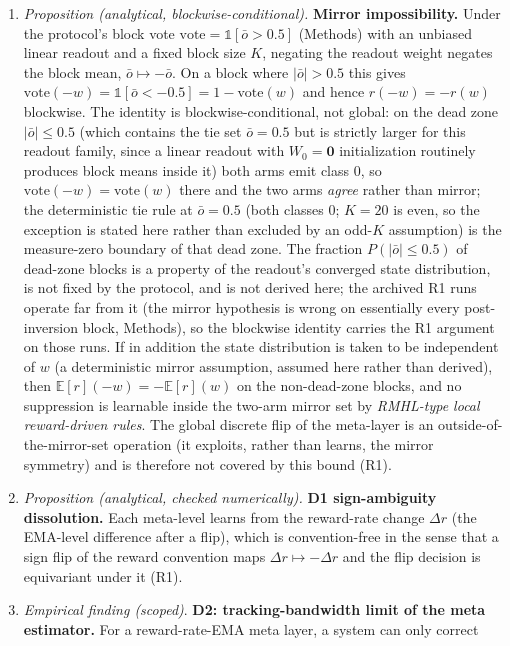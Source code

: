 \documentclass[preprint,12pt]{elsarticle}
\begin{document}
\begin{enumerate}[label=\arabic*.]
\item \emph{Proposition (analytical, blockwise-conditional).} \textbf{Mirror impossibility.} Under the protocol's block vote
$\mathrm{vote}=\mathbb 1[\bar o>0.5]$ (Methods) with an unbiased linear
readout and a fixed block size $K$, negating the readout weight negates the
block mean, $\bar o\mapsto-\bar o$. On a block where $|\bar o|>0.5$ this
gives $\mathrm{vote}(-w)=\mathbb 1[\bar o<-0.5]=1-\mathrm{vote}(w)$ and
hence $r(-w)=-r(w)$ blockwise. The identity is blockwise-conditional, not
global: on the dead zone $|\bar o|\le 0.5$ (which contains the tie set
$\bar o=0.5$ but is strictly larger for this readout family, since a linear
readout with $W_0=\mathbf 0$ initialization routinely produces block means
inside it) both arms emit class $0$, so $\mathrm{vote}(-w)=\mathrm{vote}(w)$
there and the two arms \emph{agree} rather than mirror; the deterministic
tie rule at $\bar o=0.5$ (both classes $0$; $K=20$ is even, so the exception
is stated here rather than excluded by an odd-$K$ assumption) is the
measure-zero boundary of that dead zone. The fraction
$P(|\bar o|\le 0.5)$ of dead-zone blocks is a property of the readout's
converged state distribution, is not fixed by the protocol, and is not
derived here; the archived R1 runs operate far from it (the mirror
hypothesis is wrong on essentially every post-inversion block, Methods), so
the blockwise identity carries the R1 argument on those runs. If in addition
the state distribution is taken to be independent of $w$ (a deterministic
mirror assumption, assumed here rather than derived), then
$\mathbb E[r](-w)=-\mathbb E[r](w)$ on the non-dead-zone blocks, and no
suppression is learnable inside the
two-arm mirror set by \emph{RMHL-type local reward-driven rules}. The
global discrete flip of the meta-layer is an outside-of-the-mirror-set
operation (it exploits, rather than learns, the mirror symmetry) and is
therefore not covered by this bound (R1).
\item \emph{Proposition (analytical, checked numerically).} \textbf{D1 sign-ambiguity dissolution.} Each meta-level learns from the
reward-rate change $\Delta r$ (the EMA-level difference after a flip),
which is convention-free in the sense that a sign flip of the reward
convention maps $\Delta r\mapsto-\Delta r$ and the flip decision is
equivariant under it (R1).
\item \emph{Empirical finding (scoped)}. \textbf{D2: tracking-bandwidth limit of the meta estimator.} For a
reward-rate-EMA meta layer, a system can only correct

\end{enumerate}
\end{document}
